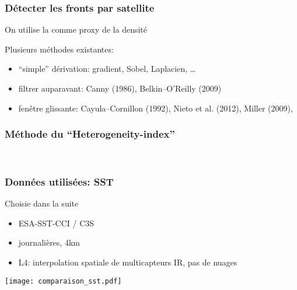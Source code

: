 \documentclass[11pt, french, aspectratio=32]{beamer}
\begin{document}
\begin{frame}
\end{frame}


\begin{frame}
  \frametitle{Détecter les fronts par satellite}

  \begin{block}{}
    On utilise la  comme proxy de la densité
  \end{block}

  \begin{block}{}
    Plusieurs méthodes existantes:
    \begin{itemize}
            \setlength{\itemsep}{1.2em}
      \item “simple” dérivation: gradient, Sobel, Laplacien, \dots
      \item filtrer auparavant: Canny (1986), Belkin--O'Reilly (2009)
      \item fenêtre glissante: Cayula--Cornillon (1992), Nieto et al. (2012), Miller (2009), 
    \end{itemize}
  \end{block}
\end{frame}


\begin{frame}
  \frametitle{Méthode du “Heterogeneity-index”}
  \\[1em]
\end{frame}


\begin{frame}
  \frametitle{Données utilisées: SST}

  \begin{block}{Choisie dans la suite}
    \begin{itemize}
      \item ESA-SST-CCI / C3S
      \item journalières, 4km
      \item L4: interpolation spatiale de multicapteurs IR, pas de nuages
    \end{itemize}
  \end{block}

  \vfill

  \texttt{[image: comparaison\_sst.pdf]}

\end{frame}
\end{document}
